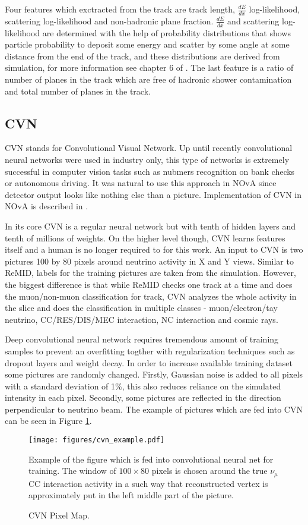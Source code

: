 Four features which exctracted from the track are track length, $\frac{dE}{dx}$ log-likelihood, scattering 
log-likelihood and non-hadronic plane fraction. $\frac{dE}{dx}$ and scattering log-likelihood are determined with 
the help of probability distributions that shows particle probability to deposit some energy and scatter by some 
angle at some distance from the end of the track, and these distributions are derived from simulation, for more 
information see chapter 6 of \cite{Nick}. The last feature is a ratio of number of planes in the track which are 
free of hadronic shower contamination and total number of planes in the track. 

\subsection{CVN}
CVN stands for Convolutional Visual Network. Up until recently convolutional neural networks were used in industry
only, this type of networks is extremely successful in computer vision tasks such as nubmers recognition on bank 
checks or autonomous driving. It was natural to use this approach in NOvA since detector output looks like nothing
else than a picture. Implementation of CVN in NOvA is described in \cite{CVN}.

In its core CVN is a regular neural network but with tenth of hidden layers and tenth of millions of weights. 
On the higher level though, CVN learns features itself and a human is no longer required to for this work.
An input to CVN is two pictures 100 by 80 pixels around neutrino activity in X and Y views. Similar to ReMID, labels 
for the training pictures are taken from the simulation. However, the biggest difference is that while ReMID checks
one track at a time and does the muon/non-muon classification for track, CVN analyzes the whole activity in the 
slice and does the classification in multiple classes - muon/electron/tay neutrino, CC/RES/DIS/MEC interaction, 
NC interaction and cosmic rays.

Deep convolutional neural network requires tremendous amount of training samples to prevent an overfitting togther 
with regularization  techniques such as dropout layers and weight decay. In order to increase available 
training dataset some pictures are randomly changed. Firstly, Gaussian noise is added to all pixels with a standard 
deviation of 1$\%$, this also reduces reliance on the simulated intensity in each pixel. Secondly, some pictures 
are reflected in the direction perpendicular to neutrino beam. The example of pictures which are fed into CVN can
be seen in Figure \ref{fig:cvn_example}.
\begin{figure}[h]
\texttt{[image: figures/cvn\_example.pdf]}
\centering
\caption{CVN Pixel Map.}
{Example of the figure which is fed into convolutional neural net for training. The window of $100\times80$ 
pixels is chosen around the true $\nu_\mu$ CC interaction activity in a such way that reconstructed vertex is 
approximately put in the left middle part of the picture.}
\label{fig:cvn_example}
\end{figure}

